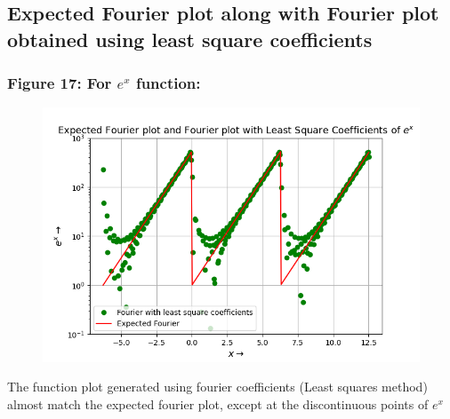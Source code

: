\documentclass[12pt, a4paper]{article}
\begin{document}
\subsection{Expected Fourier plot along with Fourier plot obtained using least square coefficients}
\subsubsection{Figure 17: For $e^{x}$ function:}
\vspace*{-0.5cm}
\begin{figure}[H]
        \centering
        \includegraphics[scale = 0.7]{Figure_17.png}
        \label{fig:sample}
    \end{figure}
\vspace*{-0.5cm}
    \begin{center}
        The function plot generated using fourier coefficients (Least squares method) almost match the expected fourier plot, except at the discontinuous points of $e^{x}$ 
    \end{center}
\end{document}
